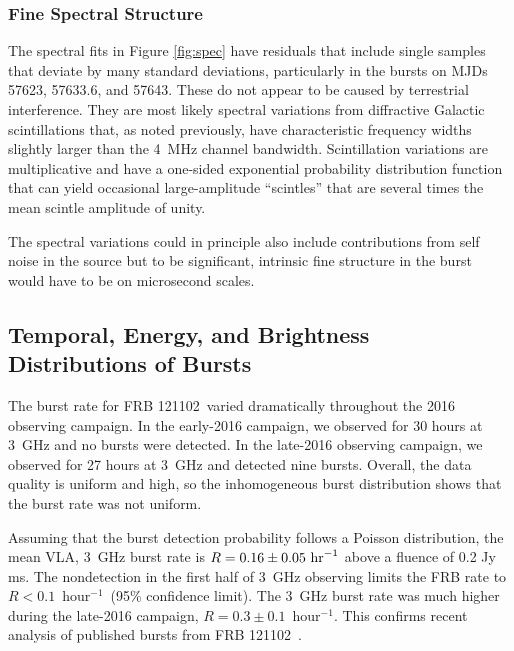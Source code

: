 \documentclass[twocolumn]{aastex61}
\newcommand{\frb}{FRB 121102}
\begin{document}
\subsubsection{Fine Spectral Structure}

The spectral fits in Figure \ref{fig:spec} have residuals that include single samples that deviate by many standard deviations, particularly in the bursts on MJDs 57623,  57633.6, and 57643. These do not appear to be caused by terrestrial interference. They are most likely spectral variations from diffractive Galactic scintillations that, as noted previously, have characteristic frequency widths slightly larger than the 4~MHz channel bandwidth.  Scintillation variations are multiplicative and have a one-sided exponential probability distribution function that can yield occasional large-amplitude ``scintles'' that are several times the mean scintle amplitude of unity.

The spectral variations could in principle also include contributions from self noise in the source but to be significant, intrinsic fine structure in the burst would have to be on microsecond scales.  

\subsection{Temporal, Energy, and Brightness Distributions of Bursts}
\label{sec:disn}

The burst rate for \frb\ varied dramatically throughout the 2016 observing campaign. In the early-2016 campaign, we observed for 30 hours at 3~GHz and no bursts were detected. In the late-2016 observing campaign, we observed for 27 hours at 3~GHz and detected nine bursts. Overall, the data quality is uniform and high, so the inhomogeneous burst distribution shows that the burst rate was not uniform.

Assuming that the burst detection probability follows a Poisson distribution, the mean VLA, 3~GHz burst rate is $R=0.16\pm0.05\ \rm{hr}^{-1}$ above a fluence of 0.2 Jy ms. The nondetection in the first half of 3~GHz observing limits the FRB rate to $R<0.1$\ hour$^{-1}$\ (95\% confidence limit). The 3~GHz burst rate was much higher during the late-2016 campaign, $R=0.3\pm0.1$\ hour$^{-1}$. This confirms recent analysis of published bursts from \frb\ \citep{2017arXiv170504881O}.
\end{document}
